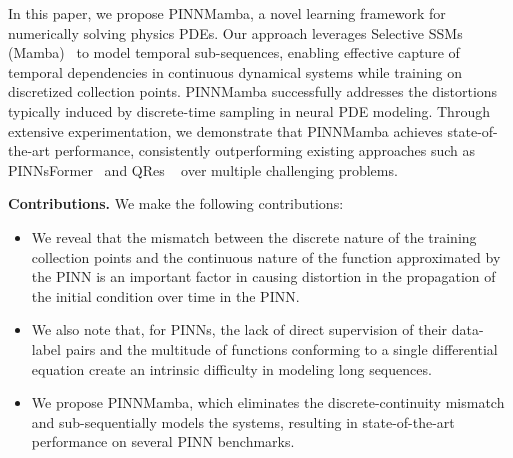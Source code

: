 In this paper, we propose PINNMamba, a novel learning framework for numerically solving physics PDEs. Our approach leverages Selective SSMs (Mamba)~\cite{gu2023mamba} to model temporal sub-sequences, enabling effective capture of temporal dependencies in continuous dynamical systems while training on discretized collection points. PINNMamba successfully addresses the distortions typically induced by discrete-time sampling in neural PDE modeling. Through extensive experimentation, we demonstrate that PINNMamba achieves state-of-the-art performance, consistently outperforming existing approaches such as PINNsFormer~\cite{zhao2024pinnsformer} and QRes ~\cite{bu2021quadratic} over multiple challenging problems.

\textbf{Contributions.} We make the following contributions:
\vspace{-2mm}
\begin{itemize}
    \item We reveal that the mismatch between the discrete nature of the training collection points and the continuous nature of the function approximated by the PINN is an important factor in causing distortion in the propagation of the initial condition over time in the PINN.
    \vspace{-6mm}
    \item We also note that, for PINNs, the lack of direct supervision of their data-label pairs and the multitude of functions conforming to a single differential equation create an intrinsic difficulty in modeling long sequences.
    \vspace{-2mm}
    \item We propose PINNMamba, which eliminates the discrete-continuity mismatch and sub-sequentially models the systems, resulting in state-of-the-art performance on several PINN benchmarks.
\end{itemize}